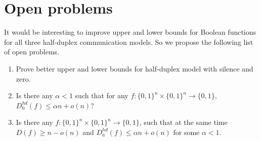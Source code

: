\section{Open problems}\label{sec:open-questions}
It would be interesting to improve upper and lower bounds for Boolean functions 
for all three half-duplex communication models.
So we propose the following list of open problems.
\begin{enumerate}
\item Prove better upper and lower bounds for half-duplex model with silence and zero.

\item Is there any $\alpha < 1$ such that for any $f:\{0,1\}^n\times\{0,1\}^n\to\{0,1\}$, $D^{hd}_0(f)\le \alpha n + o(n)$?

\item Is there any $f:\{0,1\}^n\times\{0,1\}^n\to\{0,1\}$, such that at the same time $D(f) \ge n - o(n)$ and $D^{hd}_a(f)\le \alpha n + o(n)$ for some $\alpha<1$.
\end{enumerate}
